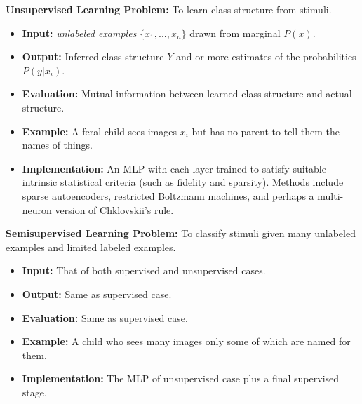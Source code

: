 \documentclass[12pt]{article}
\begin{document}
\textbf{Unsupervised Learning Problem:} To learn class structure from stimuli.
\begin{itemize}
\item \textbf{Input:} \textit{unlabeled examples} $\{x_1,...,x_n\}$ drawn from marginal $P(x)$.
\item \textbf{Output:} Inferred class structure $Y$ and
  or more estimates of the probabilities $P(y|x_{i})$.
\item \textbf{Evaluation:} Mutual information between learned class structure and actual structure.
\item \textbf{Example:} A feral child sees images $x_i$ but has no parent to tell them the names of things.
\item \textbf{Implementation:} An MLP with each layer trained to satisfy suitable intrinsic statistical criteria (such as fidelity and sparsity). Methods include sparse autoencoders, restricted Boltzmann machines, and perhaps a multi-neuron version of Chklovskii's rule.
\end{itemize}


\textbf{Semisupervised Learning Problem:} To classify stimuli given many unlabeled examples and limited labeled examples.
\begin{itemize}
\item \textbf{Input:} That of both supervised and unsupervised cases.
\item \textbf{Output:} Same as supervised case.
\item \textbf{Evaluation:} Same as supervised case.
\item \textbf{Example:} A child who sees many images only some of which are named for them.
\item \textbf{Implementation:} The MLP of unsupervised case plus a final supervised stage.
\end{itemize}










\end{document}
